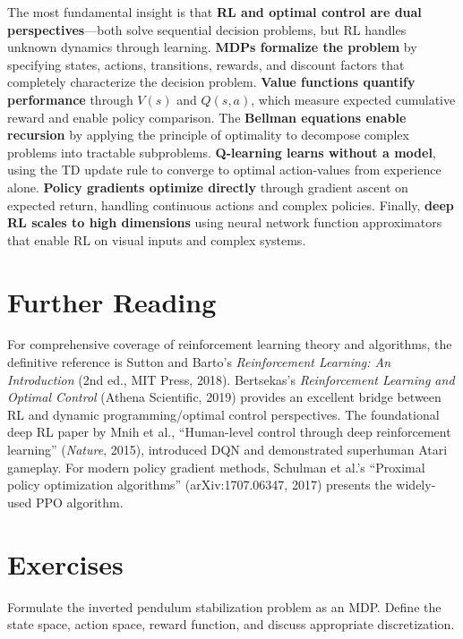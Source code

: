 The most fundamental insight is that \textbf{RL and optimal control are dual perspectives}---both solve sequential decision problems, but RL handles unknown dynamics through learning. \textbf{MDPs formalize the problem} by specifying states, actions, transitions, rewards, and discount factors that completely characterize the decision problem. \textbf{Value functions quantify performance} through $V(s)$ and $Q(s,a)$, which measure expected cumulative reward and enable policy comparison. The \textbf{Bellman equations enable recursion} by applying the principle of optimality to decompose complex problems into tractable subproblems. \textbf{Q-learning learns without a model}, using the TD update rule to converge to optimal action-values from experience alone. \textbf{Policy gradients optimize directly} through gradient ascent on expected return, handling continuous actions and complex policies. Finally, \textbf{deep RL scales to high dimensions} using neural network function approximators that enable RL on visual inputs and complex systems.

\section*{Further Reading}

For comprehensive coverage of reinforcement learning theory and algorithms, the definitive reference is Sutton and Barto's \textit{Reinforcement Learning: An Introduction} (2nd ed., MIT Press, 2018). Bertsekas's \textit{Reinforcement Learning and Optimal Control} (Athena Scientific, 2019) provides an excellent bridge between RL and dynamic programming/optimal control perspectives. The foundational deep RL paper by Mnih et al., ``Human-level control through deep reinforcement learning'' (\textit{Nature}, 2015), introduced DQN and demonstrated superhuman Atari gameplay. For modern policy gradient methods, Schulman et al.'s ``Proximal policy optimization algorithms'' (arXiv:1707.06347, 2017) presents the widely-used PPO algorithm.

\newpage
\section*{Exercises}

\begin{exercise}
Formulate the inverted pendulum stabilization problem as an MDP. Define the state space, action space, reward function, and discuss appropriate discretization.
\end{exercise}

